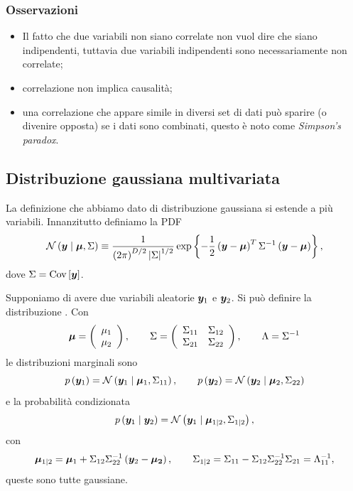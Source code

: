 \documentclass[10pt]{article}
\DeclareMathOperator{\Cov}{Cov}
\newcommand{\pare}[1]{
	\ensuremath{\left(#1\right)}
}
\newcommand{\spare}[1]{
	\ensuremath{\left[#1\right]}
}
\begin{document}
\subsubsection{Osservazioni}
\begin{itemize}
\item Il fatto che due variabili non siano correlate non vuol dire che siano indipendenti, tuttavia due variabili indipendenti sono necessariamente non correlate;
\item correlazione non implica causalità;
\item una correlazione che appare simile in diversi set di dati può sparire (o divenire opposta) se i dati sono combinati, questo è noto come \textit{Simpson's paradox}.
\end{itemize}

\subsection{Distribuzione gaussiana multivariata}
La definizione che abbiamo dato di distribuzione gaussiana si estende a più variabili. Innanzitutto definiamo la PDF
\begin{equation}
\mathcal{N}\pare{\ve{y}\cond\ve{\mu}, \Sigma} \equiv \frac{1}{\pare{2\pi}^{D/2}\left|\Sigma\right|^{1/2}}\exp\left\{-\frac{1}{2}\pare{\ve{y}-\ve{\mu}}^T\Sigma^{-1}\pare{\ve{y}-\ve{\mu}}\right\},
\end{equation}
dove $\Sigma = \Cov\spare{\ve{y}}$.

Supponiamo di avere due variabili aleatorie $\bm{y}_1$ e $\bm{y}_2$. Si può definire la distribuzione . Con
\[
\ve{\mu} = \pare{\begin{array}{c}
\mu_1 \\
\mu_2
\end{array}},\qquad
\Sigma = \pare{\begin{array}{cc}
\Sigma_{11} & \Sigma_{12} \\
\Sigma_{21} & \Sigma_{22}
\end{array}},\qquad
\Lambda = \Sigma^{-1}
\]
le distribuzioni marginali sono
\begin{equation}
p\pare{\ve{y}_1} = \mathcal{N}\pare{\ve{y}_1\cond\ve{\mu}_1, \Sigma_{11}},\qquad p\pare{\ve{y}_2} = \mathcal{N}\pare{\ve{y}_2\cond\ve{\mu}_2, \Sigma_{22}}
\end{equation}
e la probabilità condizionata
\begin{equation}
p\pare{\ve{y}_1\cond\ve{y}_2} = \mathcal{N}\pare{\ve{y}_1\cond\ve{\mu}_{1\cond 2}, \Sigma_{1\cond 2}},
\end{equation}
con
\[
\ve{\mu}_{1\cond 2} = \ve{\mu}_1 + \Sigma_{12}\Sigma_{22}^{-1}\pare{\ve{y}_2 - \ve{\mu_2}},\qquad \Sigma_{1\cond 2} = \Sigma_{11} - \Sigma_{12}\Sigma_{22}^{-1}\Sigma_{21}=\Lambda_{11}^{-1},
\]
queste sono tutte gaussiane.
\end{document}
